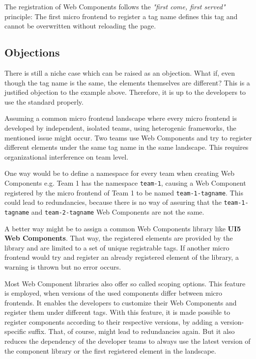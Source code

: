 The registration of Web Components follows the \textit{"first come, first served"} principle: The first micro frontend to register a tag name defines this tag and cannot be overwritten without reloading the page.\cite{mdn_web_docs_define}

\subsection{Objections}

There is still a niche case which can be raised as an objection. What if, even though the tag name is the same, the elements themselves are different? This is a justified objection to the example above. Therefore, it is up to the developers to use the standard properly.

Assuming a common micro frontend landscape where every micro frontend is developed by independent, isolated teams, using heterogenic frameworks, the mentioned issue might occur. Two teams use Web Components and try to register different elements under the same tag name in the same landscape. This requires organizational interference on team level.

One way would be to define a namespace for every team when creating Web Components e.g. Team 1 has the namespace \texttt{team-1}, causing a Web Component registered by the micro frontend of Team 1 to be named \texttt{team-1-tagname}. This could lead to redundancies, because there is no way of assuring that the \texttt{team-1-tagname} and \texttt{team-2-tagname} Web Components are not the same.\cite{wc_best_practices}

A better way might be to assign a common Web Components library like \textbf{UI5 Web Components}. That way, the registered elements are provided by the library and are limited to a set of unique registrable tags. If another micro frontend would try and register an already registered element of the library, a warning is thrown but no error occurs.

Most Web Component libraries also offer so called scoping options. This feature is employed, when versions of the used components differ between micro frontends. It enables the developers to customize their Web Components and register them under different tags. With this feature, it is made possible to register components according to their respective versions, by adding a version-specific suffix. That, of course, might lead to redundancies again. But it also reduces the dependency of the developer teams to always use the latest version of the component library or the first registered element in the landscape. \cite{ui5_webcomponents_scoping} \cite{openwc_scoping}

